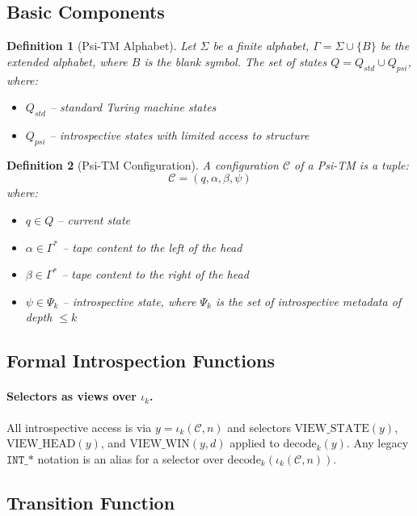 \documentclass[11pt]{article}
\newtheorem{definition}{Definition}
\begin{document}
\subsection{Basic Components}

\begin{definition}[Psi-TM Alphabet]
Let $\Sigma$ be a finite alphabet, $\Gamma = \Sigma \cup \{B\}$ be the extended alphabet, where $B$ is the blank symbol. The set of states $Q = Q_{std} \cup Q_{psi}$, where:
\begin{itemize}
\item $Q_{std}$ -- standard Turing machine states
\item $Q_{psi}$ -- introspective states with limited access to structure
\end{itemize}
\end{definition}

\begin{definition}[Psi-TM Configuration]
A configuration $\mathcal{C}$ of a Psi-TM is a tuple:
$$\mathcal{C} = (q, \alpha, \beta, \psi)$$
where:
\begin{itemize}
\item $q \in Q$ -- current state
\item $\alpha \in \Gamma^*$ -- tape content to the left of the head
\item $\beta \in \Gamma^*$ -- tape content to the right of the head
\item $\psi \in \Psi_k$ -- introspective state, where $\Psi_k$ is the set of introspective metadata of depth $\leq k$
\end{itemize}
\end{definition}

\subsection{Formal Introspection Functions}

\paragraph{Selectors as views over $\iota_k$.}
All introspective access is via $y=\iota_k(\mathcal{C},n)$ and selectors $\mathrm{VIEW\_STATE}(y)$, $\mathrm{VIEW\_HEAD}(y)$, and $\mathrm{VIEW\_WIN}(y,d)$ applied to $\mathrm{decode}_k(y)$. Any legacy $\texttt{INT\_*}$ notation is an alias for a selector over $\mathrm{decode}_k(\iota_k(\mathcal{C},n))$.

\subsection{Transition Function}
\end{document}
